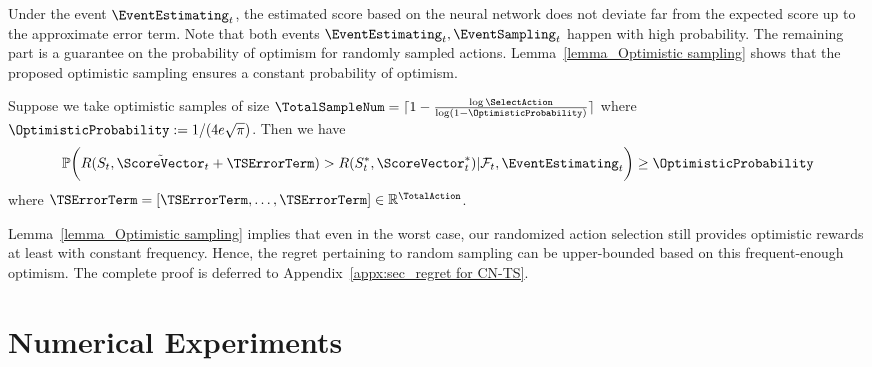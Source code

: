 \documentclass{article}
\theoremstyle{plain}
\begin{document}
Under the event $\EventEstimating_t$, the estimated score based on the neural network does not deviate far from the expected score up to the approximate error term. 
Note that both events $\EventEstimating_t, \EventSampling_t$ happen with high probability. 
The remaining part is a guarantee on the probability of optimism for randomly sampled actions.
Lemma~\ref{lemma_Optimistic sampling} shows that the proposed optimistic sampling ensures a constant probability of optimism. 
\begin{lemma} \label{lemma_Optimistic sampling}
Suppose we take optimistic samples of size $\TotalSampleNum = \lceil 1 - \frac{\log \SelectAction}{\log(1-\OptimisticProbability)} \rceil$ where $\OptimisticProbability:= 1/(4e\sqrt{\pi})$. Then we have
    \begin{equation*}
        \mathbb{P} \bigg( R (S_t, \tilde{\ScoreVector}_t + \boldsymbol{\TSErrorTerm}) > R (S_t^*, \ScoreVector_t^*) | \mathcal{F}_t, \EventEstimating_t \bigg) \ge \OptimisticProbability
    \end{equation*}
where 
$\boldsymbol{\TSErrorTerm} = [\TSErrorTerm, \ldots, \TSErrorTerm] \in \mathbb{R}^{\TotalAction}$.
\end{lemma}

Lemma~\ref{lemma_Optimistic sampling} implies that even in the worst case, our randomized action selection still provides optimistic rewards at least with constant frequency. Hence, the regret pertaining to random sampling can be upper-bounded based on this frequent-enough optimism.
The complete proof is deferred to Appendix~\ref{appx:sec_regret for CN-TS}. 


\section{Numerical Experiments} \label{sec:numerical exp}
\end{document}
